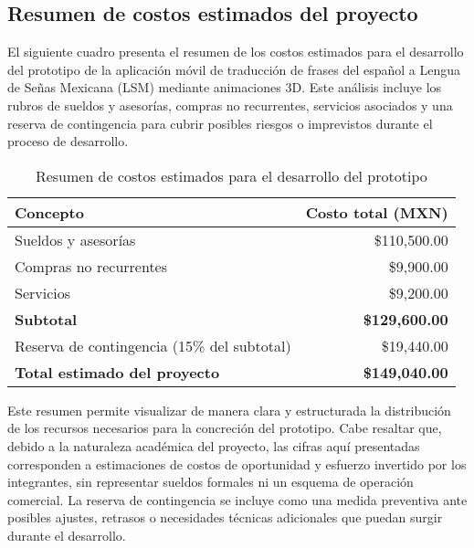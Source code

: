 \subsection{Resumen de costos estimados del proyecto}

El siguiente cuadro presenta el resumen de los costos estimados para el desarrollo del prototipo de la aplicación móvil de traducción de frases del español a Lengua de Señas Mexicana (LSM) mediante animaciones 3D. Este análisis incluye los rubros de sueldos y asesorías, compras no recurrentes, servicios asociados y una reserva de contingencia para cubrir posibles riesgos o imprevistos durante el proceso de desarrollo.

\begin{table}[h!]
	\centering
	\renewcommand{\arraystretch}{1.5}
	\setlength{\tabcolsep}{12pt}
	\begin{tabular}{|l|r|}
		\hline
		\textbf{Concepto}                        & \textbf{Costo total (MXN)} \\ \hline
		Sueldos y asesorías                      & \$110,500.00              \\ \hline
		Compras no recurrentes                   & \$9,900.00                \\ \hline
		Servicios                                & \$9,200.00                \\ \hline
		\textbf{Subtotal}                        & \textbf{\$129,600.00}     \\ \hline
		Reserva de contingencia (15\% del subtotal) & \$19,440.00            \\ \hline
		\textbf{Total estimado del proyecto}     & \textbf{\$149,040.00}     \\ \hline
	\end{tabular}
	\caption{Resumen de costos estimados para el desarrollo del prototipo}
\end{table}

Este resumen permite visualizar de manera clara y estructurada la distribución de los recursos necesarios para la concreción del prototipo. Cabe resaltar que, debido a la naturaleza académica del proyecto, las cifras aquí presentadas corresponden a estimaciones de costos de oportunidad y esfuerzo invertido por los integrantes, sin representar sueldos formales ni un esquema de operación comercial. La reserva de contingencia se incluye como una medida preventiva ante posibles ajustes, retrasos o necesidades técnicas adicionales que puedan surgir durante el desarrollo.

